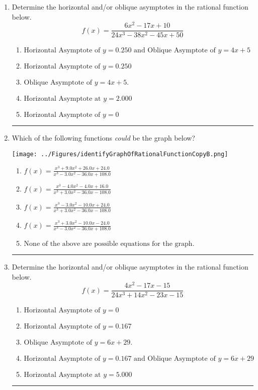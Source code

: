 \documentclass[14pt]{extbook}
\newcommand{\litem}[1]{\item#1\hspace*{-1cm}\rule{\textwidth}{0.4pt}}
\begin{document}
\begin{enumerate}
{\begin{enumerate}[label=\Alph*.]
\end{enumerate} }
\litem{
Determine the horizontal and/or oblique asymptotes in the rational function below.\[ f(x) = \frac{6x^{2} -17 x + 10}{24x^{3} -38 x^{2} -45 x + 50} \]\begin{enumerate}[label=\Alph*.]
\item \( \text{Horizontal Asymptote of } y = 0.250 \text{ and Oblique Asymptote of } y = 4x + 5 \)
\item \( \text{Horizontal Asymptote of } y = 0.250  \)
\item \( \text{Oblique Asymptote of } y = 4x + 5. \)
\item \( \text{Horizontal Asymptote at } y = 2.000 \)
\item \( \text{Horizontal Asymptote of } y = 0 \)

\end{enumerate} }
\litem{
Which of the following functions \textit{could} be the graph below?
\begin{center}
    \texttt{[image: ../Figures/identifyGraphOfRationalFunctionCopyB.png]}
\end{center}
\begin{enumerate}[label=\Alph*.]
\item \( f(x)=\frac{x^{3} +9.0 x^{2} +26.0 x + 24.0}{x^{3} -3.0 x^{2} -36.0 x + 108.0} \)
\item \( f(x)=\frac{x^{3} -4.0 x^{2} -4.0 x + 16.0}{x^{3} +3.0 x^{2} -36.0 x -108.0} \)
\item \( f(x)=\frac{x^{3} -3.0 x^{2} -10.0 x + 24.0}{x^{3} +3.0 x^{2} -36.0 x -108.0} \)
\item \( f(x)=\frac{x^{3} +3.0 x^{2} -10.0 x -24.0}{x^{3} -3.0 x^{2} -36.0 x + 108.0} \)
\item \( \text{None of the above are possible equations for the graph.} \)

\end{enumerate} }
\litem{
Determine the horizontal and/or oblique asymptotes in the rational function below.\[ f(x) = \frac{4x^{2} -17 x -15}{24x^{3} +14 x^{2} -23 x -15} \]\begin{enumerate}[label=\Alph*.]
\item \( \text{Horizontal Asymptote of } y = 0 \)
\item \( \text{Horizontal Asymptote of } y = 0.167  \)
\item \( \text{Oblique Asymptote of } y = 6x + 29. \)
\item \( \text{Horizontal Asymptote of } y = 0.167 \text{ and Oblique Asymptote of } y = 6x + 29 \)
\item \( \text{Horizontal Asymptote at } y = 5.000 \)


\end{enumerate}}
\end{enumerate}
\end{document}
